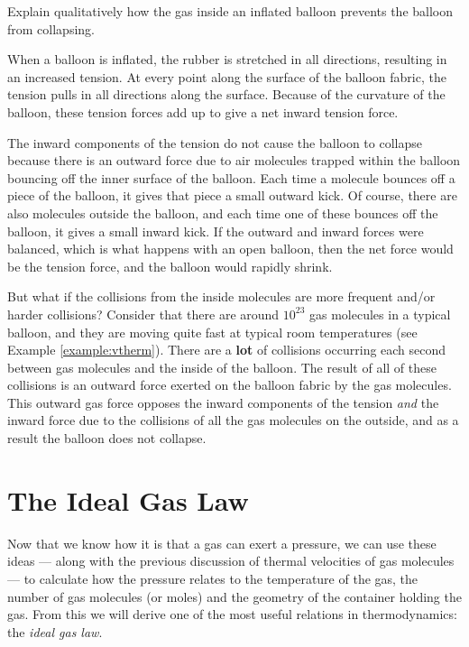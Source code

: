 \begin{example}
  Explain qualitatively how the gas inside an inflated balloon
  prevents the balloon from collapsing.

  

\solution When a balloon is inflated, the rubber is stretched in all
  directions, resulting in an increased tension.  At every point along
  the surface of the balloon fabric, the tension pulls in all
  directions along the surface.  Because of the curvature of the
  balloon, these tension forces add up to give a net inward tension
  force.

  The inward components of the tension do not cause the balloon to
  collapse because there is an outward force due to air molecules
  trapped within the balloon bouncing off the inner surface of the
  balloon.  Each time a molecule bounces off a piece of the balloon,
  it gives that piece a small outward kick.  Of course, there are also
  molecules outside the balloon, and each time one of these bounces
  off the balloon, it gives a small inward kick.  If the outward and
  inward forces were balanced, which is what happens with an open
  balloon, then the net force would be the tension force, and the
  balloon would rapidly shrink.

  But what if the collisions from the inside molecules are more
  frequent and/or harder collisions?  Consider that there are
  around $10^{23}$ gas molecules in a typical balloon, and they are
  moving quite fast at typical room temperatures (see Example
  \ref{example:vtherm}).  There are a \textbf{lot} of collisions occurring
  each second between gas molecules and the inside of the balloon.
  The result of all of these collisions is an outward force exerted on
  the balloon fabric by the gas molecules.  This outward gas force
  opposes the inward components of the tension \textit{and} the inward
  force due to the collisions of all the gas molecules on the outside,
  and as a result the balloon does not collapse.
\end{example}

\section{The Ideal Gas Law}

Now that we know how it is that a gas can exert a pressure, we
can use these ideas --- along with the previous discussion of
thermal velocities of gas molecules --- to calculate how the
pressure relates to the temperature of the gas, the number of gas
molecules (or moles) and the geometry of the container holding the
gas.  From this we will derive one of the most useful 
relations in thermodynamics: the \emph{ideal gas law}.

